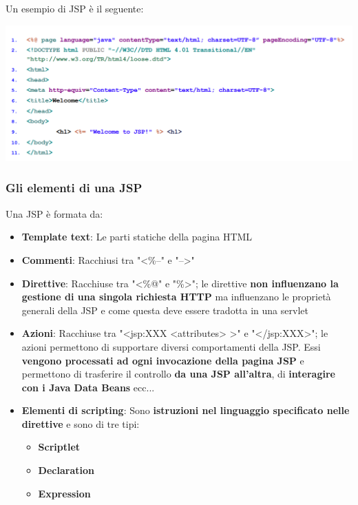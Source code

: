\documentclass[12pt]{article}
\begin{document}
Un esempio di JSP è il seguente:
\begin{center}
    \includegraphics[width = 1.15\textwidth]{Images/192.png}
\end{center}
\subsubsection{Gli elementi di una JSP}
Una JSP è formata da:
\begin{itemize}
    \item \textbf{Template text}: Le parti statiche della pagina HTML
    \item \textbf{Commenti}: Racchiusi tra "<\%--" e "-->"
    \item \textbf{Direttive}: Racchiuse tra "<\%@" e "\%>"; le direttive \textbf{non influenzano la gestione di una singola richiesta HTTP} ma influenzano le proprietà generali della JSP e come questa deve essere tradotta in una servlet
    \item \textbf{Azioni}: Racchiuse tra "<jsp:XXX <attributes> >" e "</jsp:XXX>"; le azioni permettono di supportare diversi comportamenti della JSP. Essi \textbf{vengono processati ad ogni invocazione della pagina JSP} e permettono di trasferire il controllo \textbf{da una JSP all'altra}, di \textbf{interagire con i Java Data Beans} ecc...
    \item \textbf{Elementi di scripting}: Sono \textbf{istruzioni nel linguaggio specificato nelle direttive} e sono di tre tipi:
    \begin{itemize}
        \item \textbf{Scriptlet}
        \item \textbf{Declaration}
        \item \textbf{Expression}
    \end{itemize}
\end{itemize}
\end{document}
